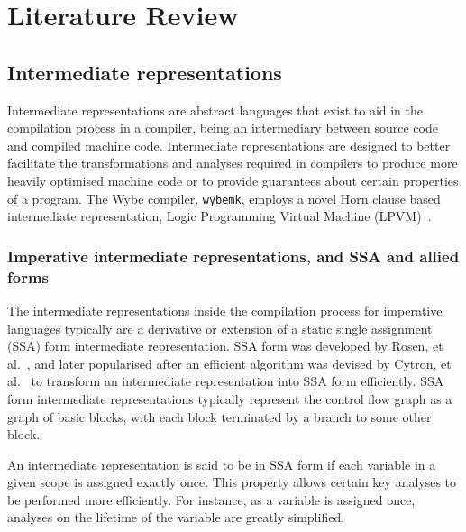 \clearpage  

\def\chaptertitle{Literature Review}

\lhead{\emph{\chaptertitle}}

\chapter{\chaptertitle}
\label{ch:lit-review}

\section{Intermediate representations}
\label{sec:intermediate-representations}

Intermediate representations are abstract languages that exist to aid in the compilation process in a compiler, being an intermediary between source code and compiled machine code. Intermediate representations are designed to better facilitate the transformations and analyses required in compilers to produce more heavily optimised machine code or to provide guarantees about certain properties of a program. The Wybe compiler, \texttt{wybemk}, employs a novel Horn clause based intermediate representation, Logic Programming Virtual Machine (LPVM)~\cite{gange2015horn}.

\subsection{Imperative intermediate representations, and SSA and allied forms}

The intermediate representations inside the compilation process for imperative languages typically are a derivative or extension of a static single assignment (SSA) form intermediate representation. SSA form was developed by Rosen, et al.~\cite{rosen1988global}, and later popularised after an efficient algorithm was devised by Cytron, et al.~\cite{cytron1991efficiently} to transform an intermediate representation into SSA form efficiently. SSA form intermediate representations typically represent the control flow graph as a graph of basic blocks, with each block terminated by a branch to some other block. 

An intermediate representation is said to be in SSA form if each variable in a given scope is assigned exactly once. This property allows certain key analyses to be performed more efficiently. For instance, as a variable is assigned once, analyses on the lifetime of the variable are greatly simplified.

